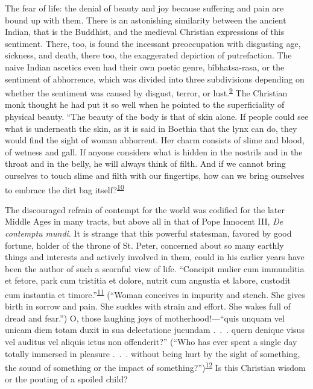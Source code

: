 The fear of life: the denial of beauty and joy because suffering and
pain are bound up with them. There is an astonishing similarity between
the ancient Indian, that is the Buddhist, and the medieval Christian
expressions of this sentiment. There, too, is found the incessant
preoccupation with disgusting age, sickness, and death, there too, the
exaggerated depiction of putrefaction. The naive Indian ascetics even
had their own poetic genre, bîbhatsa-rasa, or the
\protect\hypertarget{12_Chapter_Five__THE_VISION_OF_DEAT.xhtmlux5cux23page_160}{}{}sentiment
of abhorrence, which was divided into three subdivisions depending on
whether the sentiment was caused by disgust, terror, or
lust.\textsuperscript{\protect\hypertarget{12_Chapter_Five__THE_VISION_OF_DEAT.xhtmlux5cux23id_1333}{\protect\hyperlink{23_NOTES.xhtmlux5cux23id_1334}{9}}}
The Christian monk thought he had put it so well when he pointed to the
superficiality of physical beauty. ``The beauty of the body is that of
skin alone. If people could see what is underneath the skin, as it is
said in Boethia that the lynx can do, they would find the sight of woman
abhorrent. Her charm consists of slime and blood, of wetness and gall.
If anyone considers what is hidden in the nostrils and in the throat and
in the belly, he will always think of filth. And if we cannot bring
ourselves to touch slime and filth with our fingertips, how can we bring
ourselves to embrace the dirt bag
itself?\textsuperscript{\protect\hypertarget{12_Chapter_Five__THE_VISION_OF_DEAT.xhtmlux5cux23id_1331}{\protect\hyperlink{23_NOTES.xhtmlux5cux23id_1332}{10}}}

The discouraged refrain of contempt for the world was codified for the
later Middle Ages in many tracts, but above all in that of Pope Innocent
III, \emph{De contemptu mundi}. It is strange that this powerful
statesman, favored by good fortune, holder of the throne of St. Peter,
concerned about so many earthly things and interests and actively
involved in them, could in his earlier years have been the author of
such a scornful view of life. ``Concipit mulier cum immunditia et
fetore, park cum tristitia et dolore, nutrit cum angustia et labore,
custodit cum instantia et
timore.''\textsuperscript{\protect\hypertarget{12_Chapter_Five__THE_VISION_OF_DEAT.xhtmlux5cux23id_1329}{\protect\hyperlink{23_NOTES.xhtmlux5cux23id_1330}{11}}}
(``Woman conceives in impurity and stench. She gives birth in sorrow and
pain. She suckles with strain and effort. She wakes full of dread and
fear.'') O, those laughing joys of motherhood!---``quis unquam vel
unicam diem totam duxit in sua delectatione jucundam .~.~. quern denique
visus vel auditus vel aliquis ictus non offenderit?'' (``Who has ever
spent a single day totally immersed in pleasure .~.~. without being hurt
by the sight of something, the sound of something or the impact of
something?'')\textsuperscript{\protect\hypertarget{12_Chapter_Five__THE_VISION_OF_DEAT.xhtmlux5cux23id_1327}{\protect\hyperlink{23_NOTES.xhtmlux5cux23id_1328}{12}}}
Is this Christian wisdom or the pouting of a spoiled child?

